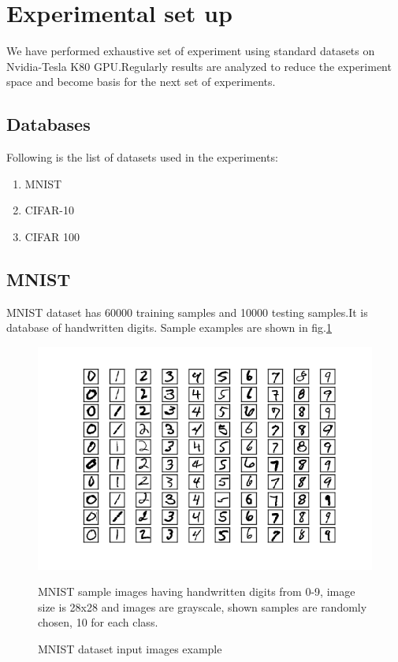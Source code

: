 \section{Experimental set up}
We have performed exhaustive set of experiment using standard datasets on Nvidia-Tesla K80 GPU.Regularly results are analyzed to reduce the experiment space and become basis for the next set of experiments.
\subsection{Databases}
Following is the list of datasets used in the experiments:
\begin{enumerate}
	\item MNIST \cite{lecun-mnisthandwrittendigit-2010}
	\item CIFAR-10 \cite{Krizhevsky09learningmultiple}
	\item CIFAR 100 \cite{Krizhevsky09learningmultiple}
\end{enumerate}
\subsection{MNIST}
MNIST dataset has 60000 training samples and 10000 testing samples.It is database of handwritten digits. Sample examples are shown in fig.\ref{fig:mnist_example}

\begin{figure}[H]\label{fig:mnist_example}
	\centering
	\includegraphics[scale=1.0]{Images/mnist}
	\caption{MNIST dataset input images example}
		\medskip
		\small
		MNIST sample images having handwritten digits from 0-9, image size is 28x28 and images are grayscale, shown samples are randomly chosen, 10 for each class.
\end{figure}


